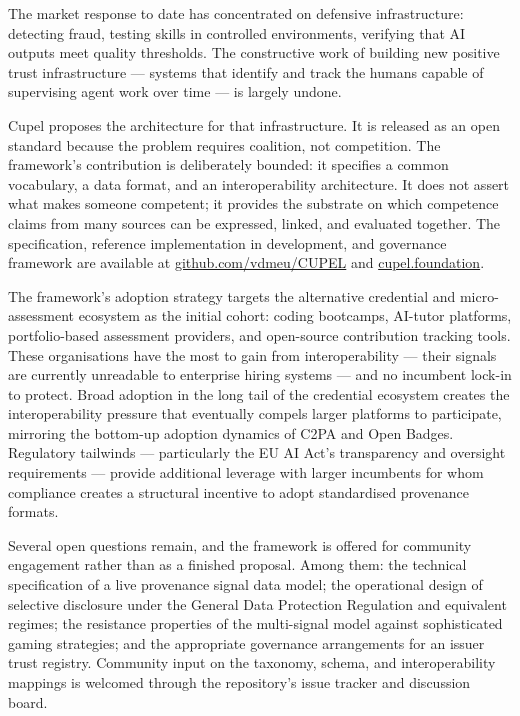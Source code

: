 \documentclass[11pt,a4paper]{article}
\begin{document}
The market response to date has concentrated on defensive infrastructure: detecting fraud,
testing skills in controlled environments, verifying that AI outputs meet quality thresholds.
The constructive work of building new positive trust infrastructure — systems that identify and
track the humans capable of supervising agent work over time — is largely undone.

Cupel proposes the architecture for that infrastructure. It is released as an open standard
because the problem requires coalition, not competition. The framework's contribution is
deliberately bounded: it specifies a common vocabulary, a data format, and an interoperability
architecture. It does not assert what makes someone competent; it provides the substrate on
which competence claims from many sources can be expressed, linked, and evaluated together. The
specification, reference implementation in development, and governance framework are available
at \href{https://github.com/vdmeu/CUPEL}{github.com/vdmeu/CUPEL} and
\href{https://cupel.foundation}{cupel.foundation}.

The framework's adoption strategy targets the alternative credential and micro-assessment
ecosystem as the initial cohort: coding bootcamps, AI-tutor platforms, portfolio-based
assessment providers, and open-source contribution tracking tools. These organisations have
the most to gain from interoperability — their signals are currently unreadable to enterprise
hiring systems — and no incumbent lock-in to protect. Broad adoption in the long tail of the
credential ecosystem creates the interoperability pressure that eventually compels larger
platforms to participate, mirroring the bottom-up adoption dynamics of C2PA and Open Badges.
Regulatory tailwinds — particularly the EU AI Act's transparency and oversight requirements —
provide additional leverage with larger incumbents for whom compliance creates a structural
incentive to adopt standardised provenance formats.

Several open questions remain, and the framework is offered for community engagement rather
than as a finished proposal. Among them: the technical specification of a live provenance signal
data model; the operational design of selective disclosure under the General Data Protection
Regulation and equivalent regimes; the resistance properties of the multi-signal model against
sophisticated gaming strategies; and the appropriate governance arrangements for an issuer
trust registry. Community input on the taxonomy, schema, and interoperability mappings is
welcomed through the repository's issue tracker and discussion board.
\end{document}

